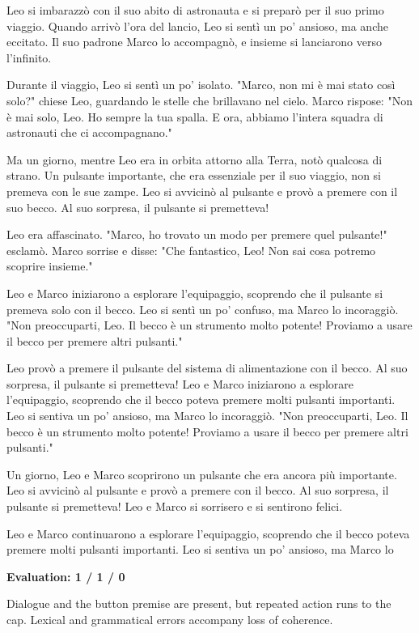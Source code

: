 \documentclass[10pt]{article}
\begin{document}
{\begin{minipage}{\textwidth}
\par\smallskip
Leo si imbarazzò con il suo abito di astronauta e si preparò per il suo primo viaggio. Quando arrivò l'ora del lancio, Leo si sentì un po' ansioso, ma anche eccitato. Il suo padrone Marco lo accompagnò, e insieme si lanciarono verso l'infinito.
\par\smallskip
Durante il viaggio, Leo si sentì un po' isolato. "Marco, non mi è mai stato così solo?" chiese Leo, guardando le stelle che brillavano nel cielo. Marco rispose: "Non è mai solo, Leo. Ho sempre la tua spalla. E ora, abbiamo l'intera squadra di astronauti che ci accompagnano."
\par\smallskip
Ma un giorno, mentre Leo era in orbita attorno alla Terra, notò qualcosa di strano. Un pulsante importante, che era essenziale per il suo viaggio, non si premeva con le sue zampe. Leo si avvicinò al pulsante e provò a premere con il suo becco. Al suo sorpresa, il pulsante si premetteva!
\par\smallskip
Leo era affascinato. "Marco, ho trovato un modo per premere quel pulsante!" esclamò. Marco sorrise e disse: "Che fantastico, Leo! Non sai cosa potremo scoprire insieme."
\par\smallskip
Leo e Marco iniziarono a esplorare l'equipaggio, scoprendo che il pulsante si premeva solo con il becco. Leo si sentì un po' confuso, ma Marco lo incoraggiò. "Non preoccuparti, Leo. Il becco è un strumento molto potente! Proviamo a usare il becco per premere altri pulsanti."
\par\smallskip
Leo provò a premere il pulsante del sistema di alimentazione con il becco. Al suo sorpresa, il pulsante si premetteva! Leo e Marco iniziarono a esplorare l'equipaggio, scoprendo che il becco poteva premere molti pulsanti importanti. Leo si sentiva un po' ansioso, ma Marco lo incoraggiò. "Non preoccuparti, Leo. Il becco è un strumento molto potente! Proviamo a usare il becco per premere altri pulsanti."
\par\smallskip
Un giorno, Leo e Marco scoprirono un pulsante che era ancora più importante. Leo si avvicinò al pulsante e provò a premere con il becco. Al suo sorpresa, il pulsante si premetteva! Leo e Marco si sorrisero e si sentirono felici.
\par\smallskip
Leo e Marco continuarono a esplorare l'equipaggio, scoprendo che il becco poteva premere molti pulsanti importanti. Leo si sentiva un po' ansioso, ma Marco lo\par\smallskip
\textbf{Evaluation: 1 / 1 / 0}\par Dialogue and the button premise are present, but repeated action runs to the cap. Lexical and grammatical errors accompany loss of coherence.

\end{minipage}}
\end{document}

